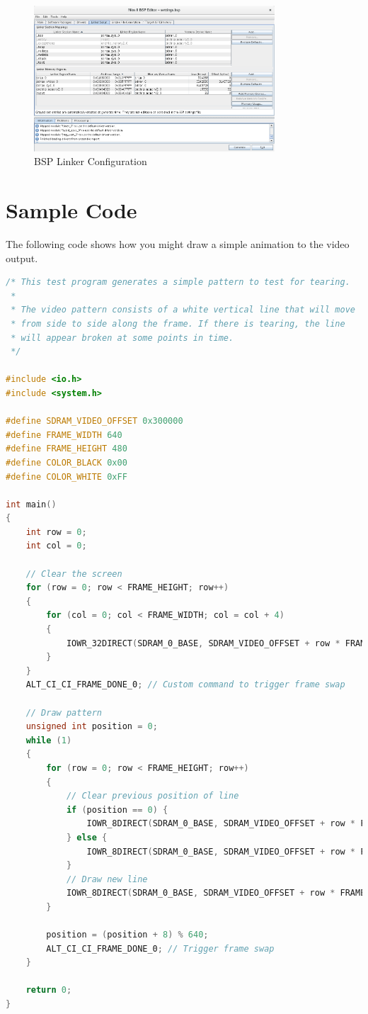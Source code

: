 \documentclass{capstonedoc}
\begin{document}
\begin{figure}[ht]
  \centering
  \includegraphics[width=9cm]{bsp_config}
  \caption{BSP Linker Configuration}
  \label{fig:bspconfig}
\end{figure}

\section{Sample Code}

The following code shows how you might draw a simple animation to the video
output.

\begin{lstlisting}[language=c,caption={Sample Program that Generates a Moving Line},label={lst:movinglinecode},tabsize=2]
/* This test program generates a simple pattern to test for tearing.
 *
 * The video pattern consists of a white vertical line that will move
 * from side to side along the frame. If there is tearing, the line
 * will appear broken at some points in time.
 */

#include <io.h>
#include <system.h>

#define SDRAM_VIDEO_OFFSET 0x300000
#define FRAME_WIDTH 640
#define FRAME_HEIGHT 480
#define COLOR_BLACK 0x00
#define COLOR_WHITE 0xFF

int main()
{
	int row = 0;
	int col = 0;

	// Clear the screen
	for (row = 0; row < FRAME_HEIGHT; row++)
	{
		for (col = 0; col < FRAME_WIDTH; col = col + 4)
		{
			IOWR_32DIRECT(SDRAM_0_BASE, SDRAM_VIDEO_OFFSET + row * FRAME_WIDTH + col, COLOR_BLACK);
		}
	}
	ALT_CI_CI_FRAME_DONE_0; // Custom command to trigger frame swap

	// Draw pattern
	unsigned int position = 0;
	while (1)
	{
		for (row = 0; row < FRAME_HEIGHT; row++)
		{
			// Clear previous position of line
			if (position == 0) {
				IOWR_8DIRECT(SDRAM_0_BASE, SDRAM_VIDEO_OFFSET + row * FRAME_WIDTH + FRAME_WIDTH - 8, COLOR_BLACK);
			} else {
				IOWR_8DIRECT(SDRAM_0_BASE, SDRAM_VIDEO_OFFSET + row * FRAME_WIDTH + position - 8, COLOR_BLACK);
			}
			// Draw new line
			IOWR_8DIRECT(SDRAM_0_BASE, SDRAM_VIDEO_OFFSET + row * FRAME_WIDTH + position, COLOR_WHITE);
		}

		position = (position + 8) % 640;
		ALT_CI_CI_FRAME_DONE_0; // Trigger frame swap
	}

	return 0;
}
\end{lstlisting}



\end{document}
